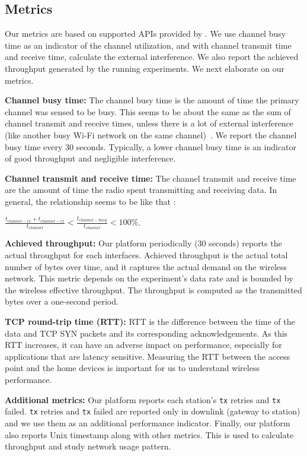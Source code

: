 \subsection{Metrics}
\label{ssec.metrics}

Our metrics are based on supported APIs provided by \sysname. We use channel busy time as an indicator of the channel utilization, and with channel transmit time and receive time, calculate the external interference. We also report the achieved throughput generated by the running experiments. We next elaborate on our metrics.

\textbf{Channel busy time:} The channel busy time is the amount of time the primary channel was sensed to be busy. This seems to be about the same as the sum of channel transmit and receive times, unless there is a lot of external interference (like another busy Wi-Fi network on the same channel)~\cite{channelsurvey}. We report the channel busy time every 30 seconds. Typically, a lower channel busy time is an indicator of good throughput and negligible interference.

\textbf{Channel transmit and receive time:} The channel transmit and receive time are the amount of time the radio spent transmitting and receiving data. In general, the relationship seems to be like that \cite{cfg80211}: 

\(\frac{t_{channel-tx} + t_{channel-rx}}{t_{channel}} < \frac{t_{channel-busy}}{t_{channel}} < 100\%\).

\textbf{Achieved throughput:} Our platform periodically (30 seconds) reports the actual throughput for each interfaces. Achieved throughput is the actual total number of bytes over time, and it captures the actual demand on the wireless network. This metric depends on the experiment's data rate and is bounded by the wireless effective throughput. The throughput is computed as the transmitted bytes over a one-second period.

\textbf{TCP round-trip time (RTT):} RTT is the difference between the time of the data and TCP SYN packets and its corresponding acknowledgements. As this RTT increases, it can have an adverse impact on performance, especially for applications that are latency sensitive. Measuring the RTT between the access point and the home devices is important for us to understand wireless performance.

\textbf{Additional metrics:} Our platform reports each station's \texttt{tx} retries and \texttt{tx} failed. \texttt{tx} retries and \texttt{tx} failed are reported only in downlink (gateway to station) and we use them as an additional performance indicator. Finally, our platform also reports Unix timestamp along with other metrics. This is used to calculate throughput and study network usage pattern. 


